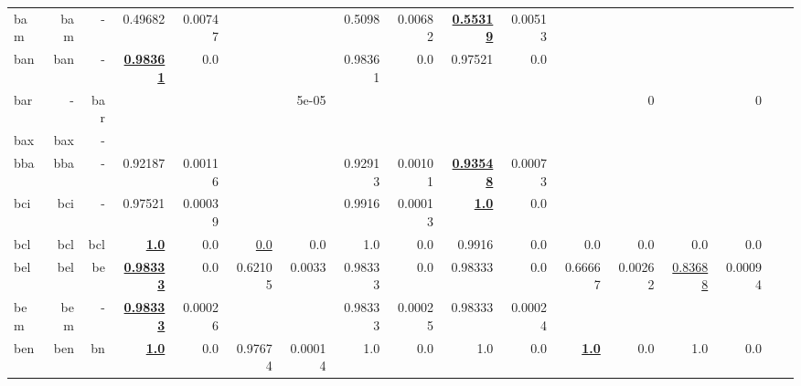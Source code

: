 \documentclass[11pt]{article}
\begin{document}
\begin{table*}[h]
{\begin{tabular}{lrrrrrrrrrrrrrrrr}
bam         & bam         & -         & 0.49682         & 0.00747         &          &          & 0.5098         & 0.00682         & \textbf{\underline{0.55319}}         & 0.00513         &          &          &          &          \\
ban         & ban         & -         & \textbf{\underline{0.98361}}         & 0.0         &          &          & 0.98361         & 0.0         & 0.97521         & 0.0         &          &          &          &          \\
bar         & -         & bar         &          &          &          & 5e-05         &          &          &          &          &          & 0         &          & 0         \\
bax         & bax         & -         &          &          &          &          &          &          &          &          &          &          &          &          \\
bba         & bba         & -         & 0.92187         & 0.00116         &          &          & 0.92913         & 0.00101         & \textbf{\underline{0.93548}}         & 0.00073         &          &          &          &          \\
bci         & bci         & -         & 0.97521         & 0.00039         &          &          & 0.9916         & 0.00013         & \textbf{\underline{1.0}}         & 0.0         &          &          &          &          \\
bcl         & bcl         & bcl         & \textbf{\underline{1.0}}         & 0.0         & \underline{0.0}         & 0.0         & 1.0         & 0.0         & 0.9916         & 0.0         & 0.0         & 0.0         & 0.0         & 0.0         \\
bel         & bel         & be         & \textbf{\underline{0.98333}}         & 0.0         & 0.62105         & 0.0033         & 0.98333         & 0.0         & 0.98333         & 0.0         & 0.66667         & 0.00262         & \underline{0.83688}         & 0.00094         \\
bem         & bem         & -         & \textbf{\underline{0.98333}}         & 0.00026         &          &          & 0.98333         & 0.00025         & 0.98333         & 0.00024         &          &          &          &          \\
ben         & ben         & bn         & \textbf{\underline{1.0}}         & 0.0         & 0.97674         & 0.00014         & 1.0         & 0.0         & 1.0         & 0.0         & \textbf{\underline{1.0}}         & 0.0         & 1.0         & 0.0         \\

\end{tabular}}
\end{table*}
\end{document}
